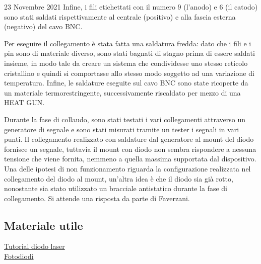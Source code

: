 \documentclass{article}
\numberwithin{equation}{section}
\begin{document}
\begin{section}{23 Novembre 2021}
\noindent Infine, i fili etichettati con il numero 9 (l'anodo) e 6 (il catodo) sono stati saldati rispettivamente al centrale (positivo) e alla fascia esterna (negativo) del cavo BNC.

\noindent Per eseguire il collegamento è stata fatta una saldatura fredda: dato che i fili e i pin sono di materiale diverso, sono stati bagnati di stagno prima di essere saldati insieme, in modo tale da creare un sistema che condividesse uno stesso reticolo cristallino e quindi si comportasse allo stesso modo soggetto ad una variazione di temperatura. Infine, le saldature eseguite sul cavo BNC sono state ricoperte da un materiale termorestringente, successivamente riscaldato per mezzo di una HEAT GUN. 

\noindent Durante la fase di collaudo, sono stati testati i vari collegamenti attraverso un generatore di segnale e  sono stati misurati tramite un tester i segnali in vari punti. Il collegamento realizzato con saldature dal generatore al mount del diodo fornisce un segnale, tuttavia il mount con diodo non sembra rispondere a nessuna tensione che viene fornita, nemmeno a quella massima supportata dal dispositivo. Una delle ipotesi di non funzionamento riguarda la configurazione realizzata nel collegamento del diodo al mount, un'altra idea è che il diodo sia già rotto, nonostante sia stato utilizzato un bracciale antistatico durante la fase di collegamento. Si attende una risposta da parte di Faverzani.
\subsection{Materiale utile}
\href{https://www.thorlabs.com/newgrouppage9.cfm?objectgroup_id=1832}{Tutorial diodo laser}\\
\href{https://www.thorlabs.com/newgrouppage9.cfm?objectgroup_id=285}{Fotodiodi}
\end{section}
\end{document}
